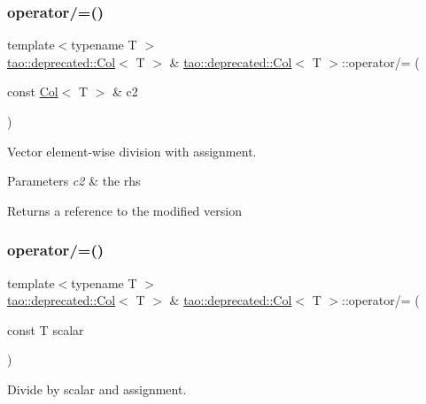 \subsubsection{\texorpdfstring{operator/=()}{operator/=()}\hspace{0.1cm}{\footnotesize\ttfamily [1/2]}}
{\footnotesize\ttfamily template$<$typename T $>$ \\
\mbox{\hyperlink{classtao_1_1deprecated_1_1_col}{tao\+::deprecated\+::\+Col}}$<$ T $>$ \& \mbox{\hyperlink{classtao_1_1deprecated_1_1_col}{tao\+::deprecated\+::\+Col}}$<$ T $>$\+::operator/= (\begin{DoxyParamCaption}\item[{const \mbox{\hyperlink{classtao_1_1deprecated_1_1_col}{Col}}$<$ T $>$ \&}]{c2 }\end{DoxyParamCaption})}



Vector element-\/wise division with assignment. 


\begin{DoxyParams}{Parameters}
{\em c2} & the rhs \\
\hline
\end{DoxyParams}
\begin{DoxyReturn}{Returns}
a reference to the modified version 
\end{DoxyReturn}
\mbox{\label{classtao_1_1deprecated_1_1_col_a0d3991ffc0e7f3859bfa19cb2e125062}} 
\subsubsection{\texorpdfstring{operator/=()}{operator/=()}\hspace{0.1cm}{\footnotesize\ttfamily [2/2]}}
{\footnotesize\ttfamily template$<$typename T $>$ \\
\mbox{\hyperlink{classtao_1_1deprecated_1_1_col}{tao\+::deprecated\+::\+Col}}$<$ T $>$ \& \mbox{\hyperlink{classtao_1_1deprecated_1_1_col}{tao\+::deprecated\+::\+Col}}$<$ T $>$\+::operator/= (\begin{DoxyParamCaption}\item[{const T}]{scalar }\end{DoxyParamCaption})}



Divide by scalar and assignment. 


